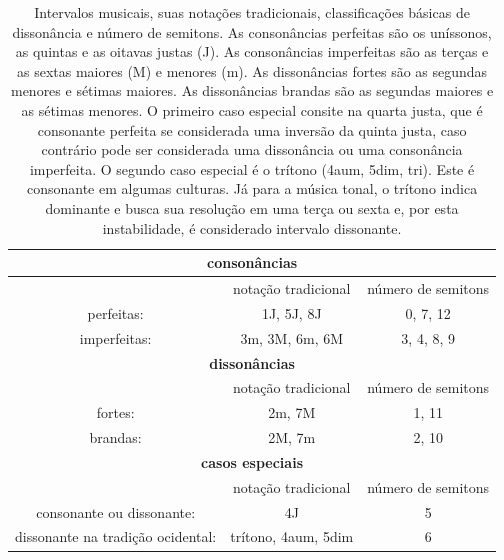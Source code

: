 \begin{table}[htpq!]
\centering
\caption{Intervalos musicais, suas notações tradicionais, classificações básicas de dissonância e número de semitons.
As consonâncias perfeitas são os uníssonos, as quintas e as oitavas justas (J). As consonâncias imperfeitas são
as terças e as sextas maiores (M) e menores (m). As dissonâncias fortes são as segundas menores e sétimas maiores. As dissonâncias
brandas são as segundas maiores e as sétimas menores. O primeiro caso especial consite na quarta justa, que é consonante perfeita
se considerada uma inversão da quinta justa, caso contrário pode ser considerada uma dissonância ou uma consonância imperfeita. O segundo caso especial é o trítono (4aum, 5dim, tri). Este é consonante em algumas culturas. Já para a música tonal, o trítono indica dominante e busca sua resolução em uma terça ou sexta e, por esta instabilidade, é considerado intervalo dissonante.}
\begin{tabular}{| c | c | c | }\hline
    \multicolumn{3}{|c|}{\bf consonâncias}  \\\hline
   & notação tradicional & número de semitons \\
   perfeitas: & 1J, 5J, 8J & 0, 7, 12 \\
 imperfeitas: & 3m, 3M, 6m, 6M & 3, 4, 8, 9 \\\hline\hline
    \multicolumn{3}{|c|}{\bf dissonâncias} \\\hline
 & notação tradicional & número de semitons \\
 fortes: & 2m, 7M & 1, 11 \\
 brandas: & 2M, 7m & 2, 10 \\\hline\hline
    \multicolumn{3}{|c|}{\bf casos especiais} \\\hline
 & notação tradicional & número de semitons \\
 consonante ou dissonante: & 4J & 5 \\
 dissonante na tradição ocidental: & trítono, 4aum, 5dim & 6 \\\hline
\end{tabular}\label{eq:intervalos}
\end{table}


